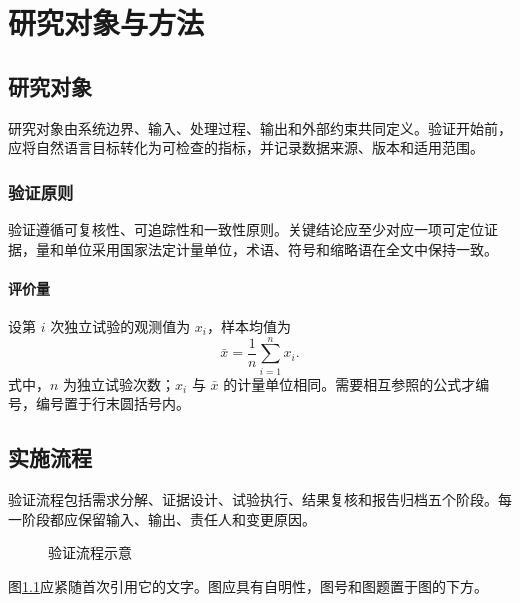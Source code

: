 \chapter{研究对象与方法}

\section{研究对象}

研究对象由系统边界、输入、处理过程、输出和外部约束共同定义。验证开始前，应将自然语言目标转化为可检查的指标，并记录数据来源、版本和适用范围。

\subsection{验证原则}

验证遵循可复核性、可追踪性和一致性原则。关键结论应至少对应一项可定位证据，量和单位采用国家法定计量单位，术语、符号和缩略语在全文中保持一致。

\subsubsection{评价量}

设第 $i$ 次独立试验的观测值为 $x_i$，样本均值为
\begin{equation}
  \bar{x}=\frac{1}{n}\sum_{i=1}^{n}x_i .
  \label{eq:mean}
\end{equation}
式中，$n$ 为独立试验次数；$x_i$ 与 $\bar{x}$ 的计量单位相同。需要相互参照的公式才编号，编号置于行末圆括号内。

\section{实施流程}

验证流程包括需求分解、证据设计、试验执行、结果复核和报告归档五个阶段。每一阶段都应保留输入、输出、责任人和变更原因。

\begin{figure}[htbp]
  \centering
  \par
  \caption{验证流程示意}
  \label{fig:workflow}
\end{figure}

图\ref{fig:workflow}应紧随首次引用它的文字。图应具有自明性，图号和图题置于图的下方。
